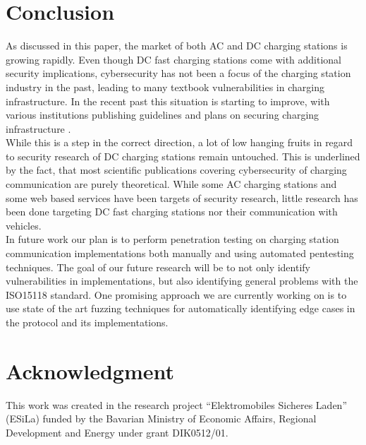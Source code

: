 \documentclass[conference,flushend]{iaria} %
\begin{document}
\section{Conclusion}
As discussed in this paper, the market of both AC and DC charging stations is growing rapidly.
Even though DC fast charging stations come with additional security implications, cybersecurity has not been a focus of the charging station industry in the past, leading to many textbook vulnerabilities in charging infrastructure.
In the recent past this situation is starting to improve, with various institutions publishing guidelines and plans on securing charging infrastructure \cite{mccarthy_cybersecurity_2023, encs_security_nodate}. \\
While this is a step in the correct direction, a lot of low hanging fruits in regard to security research of DC charging stations remain untouched.
This is underlined by the fact, that most scientific publications covering cybersecurity of charging communication are purely theoretical.
While some AC charging stations and some web based services have been targets of security research, little research has been done targeting DC fast charging stations nor their communication with vehicles. \\
In future work our plan is to perform penetration testing on charging station communication implementations both manually and using automated pentesting techniques.
The goal of our future research will be to not only identify vulnerabilities in implementations, but also identifying general problems with the ISO15118 standard.
One promising approach we are currently working on is to use state of the art fuzzing techniques for automatically identifying edge cases in the protocol and its implementations.

\section*{Acknowledgment}
This work was created in the research project \enquote{Elektromobiles Sicheres Laden} (ESiLa) funded by the Bavarian Ministry of Economic Affairs, Regional Development and Energy under grant DIK0512/01.

\printbibliography
\end{document}
